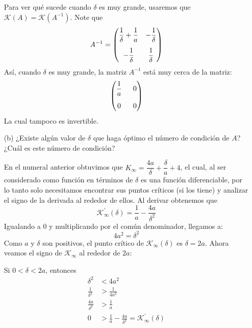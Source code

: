 \begin{enumerate}
\begin{solution}
    Para ver qué sucede cuando $\delta$ es muy grande, usaremos que $\mathcal{K}(A)=\mathcal{K}(A^{-1})$. Note que
    \[
    A^{-1}=\begin{pmatrix}
    \dfrac{1}{\delta} + \dfrac{1}{a} & -\dfrac{1}{\delta}
    \vspace{0.3 cm}\\  -\dfrac{1}{\delta} & \dfrac{1}{\delta} 
    \end{pmatrix}
    \]
    Así, cuando $\delta$ es muy grande, la matriz $A^{-1}$ está muy cerca de la matriz:
    \[
    \begin{pmatrix}
    \dfrac{1}{a} & \hspace{0.2 cm}  0 \vspace{0.3 cm} \\ 
    0 & \hspace{0.2 cm} 0
    \end{pmatrix}
    \]
    La cual tampoco es invertible.
    \end{solution}
    \item[(b)] ¿Existe algún valor de $\delta$ que haga óptimo el número de condición de $A$? ¿Cuál es este número de condición?\\ 

    \begin{solution}
    En el numeral anterior obtuvimos que $K_{\infty}=\dfrac{4a}{\delta} + \dfrac{\delta}{a}+ 4$, el cual, al ser considerado como función en términos de $\delta$ es una función diferenciable, por lo tanto solo necesitamos encontrar sus puntos críticos (si los tiene) y analizar el signo de la derivada al rededor de ellos. Al derivar obtenemos que
    \[
    \mathcal{K}_{\infty}^{\prime}(\delta)=\frac{1}{a}-\frac{4a}{\delta^{2}}
    \]
    Igualando a 0 y multiplicando por el común denominador, llegamos a:
    \[
    4a^2=\delta^2
    \]
    Como $a$ y $\delta$ son positivos, el punto crítico de $\mathcal{K}_{\infty}(\delta)$ es $\delta=2a$. Ahora veamos el signo de $\mathcal{K}_{\infty}$ al rededor de $2a$:

    Si $0 < \delta < 2a$, entonces
    \begin{align*}
      \delta^2 &< 4a^2 \\
      \frac{1}{\delta^2} &> \frac{1}{4a^2} \\ 
      \frac{4a}{\delta^2} & > \frac{1}{a} \\    
      0 & > \frac{1}{a}-\frac{4a}{\delta^2} = \mathcal{K}_{\infty}^{\prime}(\delta)
      \end{align*}  


\end{solution}
\end{enumerate}
